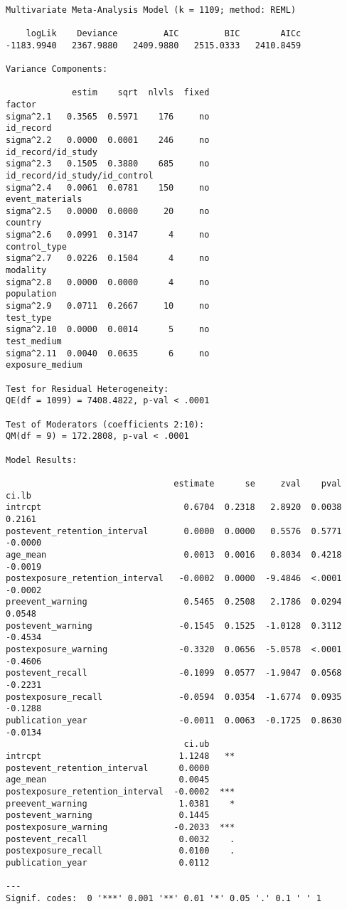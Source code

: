 \documentclass[
  letterpaper,
  DIV=11,
  numbers=noendperiod]{scrartcl}
\begin{document}
\begin{verbatim}

Multivariate Meta-Analysis Model (k = 1109; method: REML)

    logLik    Deviance         AIC         BIC        AICc   
-1183.9940   2367.9880   2409.9880   2515.0333   2410.8459   

Variance Components:

             estim    sqrt  nlvls  fixed                         factor 
sigma^2.1   0.3565  0.5971    176     no                      id_record 
sigma^2.2   0.0000  0.0001    246     no             id_record/id_study 
sigma^2.3   0.1505  0.3880    685     no  id_record/id_study/id_control 
sigma^2.4   0.0061  0.0781    150     no                event_materials 
sigma^2.5   0.0000  0.0000     20     no                        country 
sigma^2.6   0.0991  0.3147      4     no                   control_type 
sigma^2.7   0.0226  0.1504      4     no                       modality 
sigma^2.8   0.0000  0.0000      4     no                     population 
sigma^2.9   0.0711  0.2667     10     no                      test_type 
sigma^2.10  0.0000  0.0014      5     no                    test_medium 
sigma^2.11  0.0040  0.0635      6     no                exposure_medium 

Test for Residual Heterogeneity:
QE(df = 1099) = 7408.4822, p-val < .0001

Test of Moderators (coefficients 2:10):
QM(df = 9) = 172.2808, p-val < .0001

Model Results:

                                 estimate      se     zval    pval    ci.lb 
intrcpt                            0.6704  0.2318   2.8920  0.0038   0.2161 
postevent_retention_interval       0.0000  0.0000   0.5576  0.5771  -0.0000 
age_mean                           0.0013  0.0016   0.8034  0.4218  -0.0019 
postexposure_retention_interval   -0.0002  0.0000  -9.4846  <.0001  -0.0002 
preevent_warning                   0.5465  0.2508   2.1786  0.0294   0.0548 
postevent_warning                 -0.1545  0.1525  -1.0128  0.3112  -0.4534 
postexposure_warning              -0.3320  0.0656  -5.0578  <.0001  -0.4606 
postevent_recall                  -0.1099  0.0577  -1.9047  0.0568  -0.2231 
postexposure_recall               -0.0594  0.0354  -1.6774  0.0935  -0.1288 
publication_year                  -0.0011  0.0063  -0.1725  0.8630  -0.0134 
                                   ci.ub      
intrcpt                           1.1248   ** 
postevent_retention_interval      0.0000      
age_mean                          0.0045      
postexposure_retention_interval  -0.0002  *** 
preevent_warning                  1.0381    * 
postevent_warning                 0.1445      
postexposure_warning             -0.2033  *** 
postevent_recall                  0.0032    . 
postexposure_recall               0.0100    . 
publication_year                  0.0112      

---
Signif. codes:  0 '***' 0.001 '**' 0.01 '*' 0.05 '.' 0.1 ' ' 1
\end{verbatim}
\end{document}
